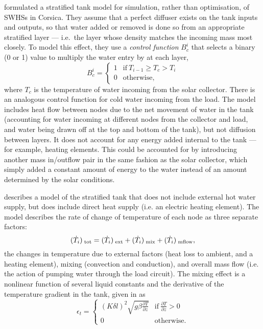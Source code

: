 \textcite{Cristofari02} formulated a stratified tank model for simulation, rather than optimisation, of SWHSs in Corsica.
They assume that a perfect diffuser exists on the tank inputs and outputs, so that water added or removed is done so from an appropriate stratified layer --- i.e.\ the layer whose density matches the incoming mass most closely.
To model this effect, they use a \emph{control function} $B_c^i$ that selects a binary (0 or 1) value to multiply the water entry by at each layer,
$$ B_c^i = \left\{ \begin{array}{ll}
   1 & \text{if}\ T_{i-1} \geq T_c > T_i \\
   0 & \text{otherwise},
\end{array} \right. $$
where $T_c$ is the temperature of water incoming from the solar collector.
There is an analogous control function for cold water incoming from the load.
The model includes heat flow between nodes due to the net movement of water in the tank (accounting for water incoming at different nodes from the collector and load, and water being drawn off at the top and bottom of the tank), but not diffusion between layers.
It does not account for any energy added internal to the tank --- for example, heating elements.
This could be accounted for by introducing another mass in/outflow pair in the same fashion as the solar collector, which simply added a constant amount of energy to the water instead of an amount determined by the solar conditions.

\textcite{Pfeiffer11} describes a model of the stratified tank that does not include external hot water supply, but does include direct heat supply (i.e. an electric heating element).
The model describes the rate of change of temperature of each node as three separate factors:
$$ (\dot{T}_{i})_{\;\text{tot}} = (\dot{T}_{i})_{\;\text{ext}} + (\dot{T}_{i})_{\;\text{mix}} + (\dot{T}_{i})_{\;\text{mflow}}, $$
the changes in temperature due to external factors (heat loss to ambient, and a heating element), mixing (convection and conduction), and overall mass flow (i.e. the action of pumping water through the load circuit).
The mixing effect is a nonlinear function of several liquid constants and the derivative of the temperature gradient in the tank, given in \textcite{Hawlader88} as
$$ \epsilon_t = \left\{ \begin{array}{ll}
   (K \delta l)^2 \sqrt{g \beta \frac{\partial T}{\partial z}} & \text{if}\ \frac{\partial T}{\partial z} > 0 \\
   0 & \text{otherwise}.
\end{array} \right. $$

